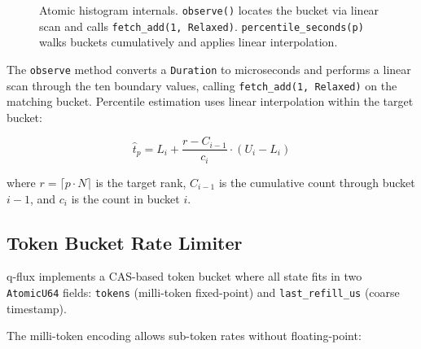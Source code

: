 \documentclass[a4paper, 11pt]{article}
\begin{document}
\begin{figure}[t]
\centering
{}
\caption{Atomic histogram internals. \texttt{observe()} locates
  the bucket via linear scan and calls \texttt{fetch\_add(1, Relaxed)}.
  \texttt{percentile\_seconds(p)} walks buckets cumulatively and
  applies linear interpolation.}
\label{fig:atomic-histogram}
\end{figure}

The \texttt{observe} method converts a \texttt{Duration} to
microseconds and performs a linear scan through the ten boundary
values, calling \texttt{fetch\_add(1,~Relaxed)} on the matching bucket.
Percentile estimation uses linear interpolation within the target bucket:

\begin{equation}
\hat{t}_p = L_i + \frac{r - C_{i-1}}{c_i} \cdot (U_i - L_i)
\label{eq:hist-interp}
\end{equation}

where $r = \lceil p \cdot N \rceil$ is the target rank, $C_{i-1}$ is
the cumulative count through bucket $i-1$, and $c_i$ is the count in
bucket $i$.

\subsection{Token Bucket Rate Limiter}
\label{sec:token-bucket}

q-flux implements a CAS-based token bucket where all state fits in two
\texttt{AtomicU64} fields: \texttt{tokens} (milli-token fixed-point)
and \texttt{last\_refill\_us} (coarse timestamp).

The milli-token encoding allows sub-token rates without floating-point:
\end{document}
